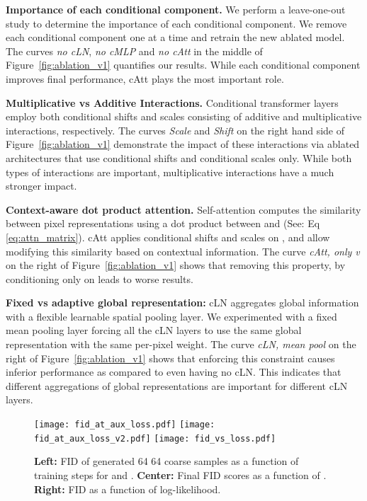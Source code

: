 \documentclass{article} \usepackage{iclr2021_conference,times}
\begin{document}
\textbf{Importance of each conditional component.} We perform a leave-one-out study to determine the importance of each conditional component. We remove each conditional component one at a time and retrain the new ablated model. The curves \textit{no cLN}, \textit{no cMLP} and \textit{no cAtt} in the middle of Figure~\ref{fig:ablation_v1} quantifies our results. While each conditional component improves final performance, cAtt plays the most important role.

\textbf{Multiplicative vs Additive Interactions.}  Conditional transformer layers employ both conditional shifts and scales consisting of additive and multiplicative interactions, respectively. The curves \textit{Scale} and \textit{Shift} on the right hand side of Figure~\ref{fig:ablation_v1} demonstrate the impact of these interactions via ablated architectures that use conditional shifts and conditional scales only. While both types of interactions are important, multiplicative interactions have a much stronger impact.

\textbf{Context-aware dot product attention.} Self-attention computes the similarity between pixel representations using a dot product between  and  (See: Eq~ \ref{eq:attn_matrix}). cAtt applies conditional shifts and scales on ,  and allow modifying this similarity based on contextual information. The curve \textit{cAtt, only v} on the right of Figure~\ref{fig:ablation_v1} shows that removing this property, by conditioning only on  leads to worse results.

\textbf{Fixed vs adaptive global representation:} cLN aggregates global information with a flexible learnable spatial pooling layer. We experimented with a fixed mean pooling layer forcing all the cLN layers to use the same global representation with the same per-pixel weight. The curve \textit{cLN, mean pool} on the right of Figure~\ref{fig:ablation_v1} shows that enforcing this constraint causes inferior performance as compared to even having no cLN. This indicates that different aggregations of global representations are important for different cLN layers.

\begin{figure*}
\centering
\texttt{[image: fid\_at\_aux\_loss.pdf]} \hfill
\texttt{[image: fid\_at\_aux\_loss\_v2.pdf]} \hfill
\texttt{[image: fid\_vs\_loss.pdf]}

\caption{\textbf{Left:} FID of generated 64  64 coarse samples as a function of training steps for  and . \textbf{Center:} Final FID scores as a function of . \textbf{Right:} FID as a function of log-likelihood.}
\label{fig:ablation_aux_loss}
\end{figure*}
\end{document}
